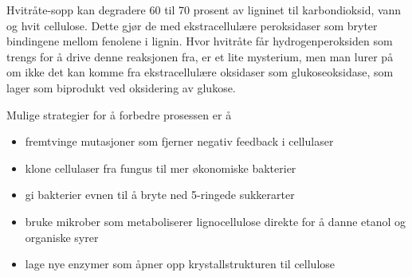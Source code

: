Hvitråte-sopp kan degradere 60 til 70 prosent av ligninet til karbondioksid, vann og hvit cellulose. Dette gjør de med ekstracellulære peroksidaser som bryter bindingene mellom fenolene i lignin. Hvor hvitråte får hydrogenperoksiden som trengs for å drive denne reaksjonen fra, er et lite mysterium, men man lurer på om ikke det kan komme fra ekstracellulære oksidaser som glukoseoksidase, som lager  som biprodukt ved oksidering av glukose.

Mulige strategier for å forbedre prosessen er å
\begin{itemize}[nolistsep,noitemsep]
	\item fremtvinge mutasjoner som fjerner negativ feedback i cellulaser
	\item klone cellulaser fra fungus til mer økonomiske bakterier
	\item gi bakterier evnen til å bryte ned 5-ringede sukkerarter
	\item bruke mikrober som metaboliserer lignocellulose direkte for å danne etanol og organiske syrer
	\item lage nye enzymer som åpner opp krystallstrukturen til cellulose
\end{itemize}

